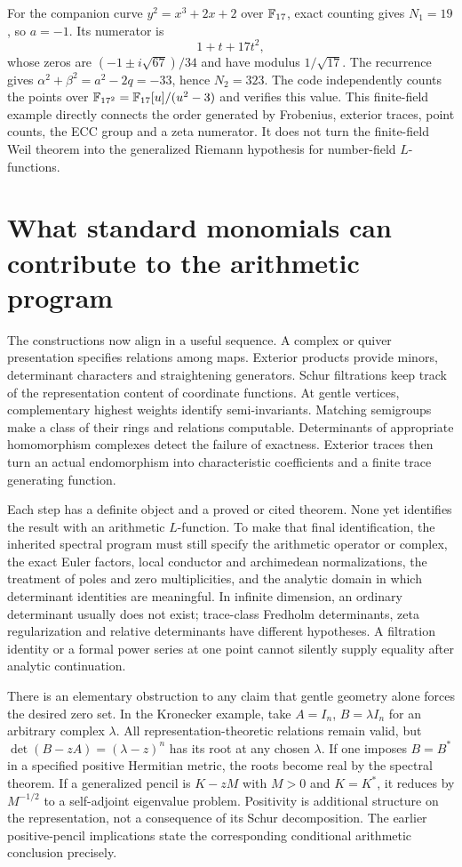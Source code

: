 For the companion curve \(y^2=x^3+2x+2\) over \(\mathbb{F}_{17}\), exact counting gives \(N_1=19\), so \(a=-1\). Its numerator is
\[
 1+t+17t^2,
\]
whose zeros are \((-1\pm i\sqrt{67})/34\) and have modulus \(1/\sqrt{17}\). The recurrence gives \(\alpha^2+\beta^2=a^2-2q=-33\), hence \(N_2=323\). The code independently counts the points over \(\mathbb{F}_{17^2}=\mathbb{F}_{17}[u]/(u^2-3)\) and verifies this value. This finite-field example directly connects the order generated by Frobenius, exterior traces, point counts, the ECC group and a zeta numerator. It does not turn the finite-field Weil theorem into the generalized Riemann hypothesis for number-field \(L\)-functions.

\section{What standard monomials can contribute to the arithmetic program}
The constructions now align in a useful sequence. A complex or quiver presentation specifies relations among maps. Exterior products provide minors, determinant characters and straightening generators. Schur filtrations keep track of the representation content of coordinate functions. At gentle vertices, complementary highest weights identify semi-invariants. Matching semigroups make a class of their rings and relations computable. Determinants of appropriate homomorphism complexes detect the failure of exactness. Exterior traces then turn an actual endomorphism into characteristic coefficients and a finite trace generating function.

Each step has a definite object and a proved or cited theorem. None yet identifies the result with an arithmetic \(L\)-function. To make that final identification, the inherited spectral program must still specify the arithmetic operator or complex, the exact Euler factors, local conductor and archimedean normalizations, the treatment of poles and zero multiplicities, and the analytic domain in which determinant identities are meaningful. In infinite dimension, an ordinary determinant usually does not exist; trace-class Fredholm determinants, zeta regularization and relative determinants have different hypotheses. A filtration identity or a formal power series at one point cannot silently supply equality after analytic continuation.

There is an elementary obstruction to any claim that gentle geometry alone forces the desired zero set. In the Kronecker example, take \(A=I_n\), \(B=\lambda I_n\) for an arbitrary complex \(\lambda\). All representation-theoretic relations remain valid, but
\(\det(B-zA)=(\lambda-z)^n\) has its root at any chosen \(\lambda\). If one imposes \(B=B^*\) in a specified positive Hermitian metric, the roots become real by the spectral theorem. If a generalized pencil is \(K-zM\) with \(M>0\) and \(K=K^*\), it reduces by \(M^{-1/2}\) to a self-adjoint eigenvalue problem. Positivity is additional structure on the representation, not a consequence of its Schur decomposition. The earlier positive-pencil implications state the corresponding conditional arithmetic conclusion precisely.

